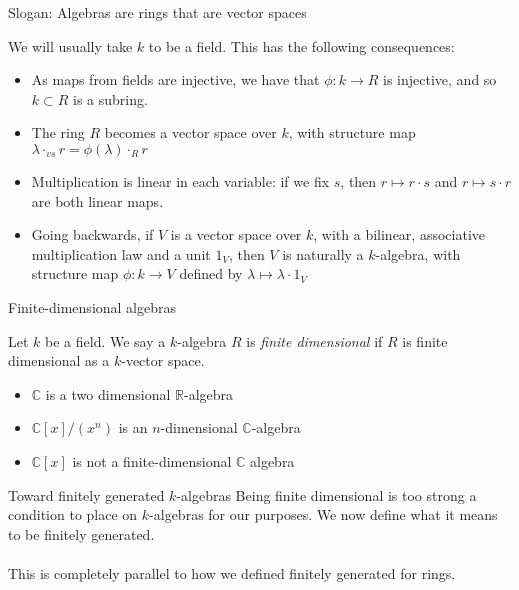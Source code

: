 \documentclass{beamer}
\newcommand{\C}{\mathbb{C}}
\newcommand{\R}{\mathbb{R}}
\begin{document}
\begin{frame}{Slogan: Algebras are rings that are vector spaces}

We will usually take $k$ to be a field.  This has the following consequences:

\begin{itemize}
\item As maps from fields are injective, we have that $\phi:k\to R$ is injective, and so $k\subset R$ is a subring.
\item The ring $R$ becomes a vector space over $k$, with structure map $\lambda\cdot_{vs} r=\phi(\lambda)\cdot_R r$
\item Multiplication is linear in each variable: if we fix $s$, then $r\mapsto r\cdot s$ and $r\mapsto s\cdot r$ are both linear maps.
\item Going backwards, if $V$ is a vector space over $k$, with a bilinear, associative multiplication law and a unit $1_V$, then $V$ is naturally a $k$-algebra, with structure map $\phi:k\to V$ defined by $\lambda\mapsto \lambda\cdot 1_V$

\end{itemize}

\end{frame}

\begin{frame}{Finite-dimensional algebras }
\begin{definition} Let $k$ be a field.  We say a $k$-algebra $R$ is \emph{finite dimensional} if $R$ is finite dimensional as a $k$-vector space.
\end{definition}

\begin{example}
\begin{itemize}
\item $\C$ is a two dimensional $\R$-algebra
\item $\C[x]/(x^n)$ is an $n$-dimensional $\C$-algebra
\item $\C[x]$ is \alert{not} a finite-dimensional $\C$ algebra
\end{itemize}
\end{example}
\end{frame}

\begin{frame}{Toward finitely generated $k$-algebras}
Being finite dimensional is too strong a condition to place on $k$-algebras for our purposes.  We now define what it means to be finitely generated.  \\~\\

This is completely parallel to how we defined finitely generated for rings.


\end{frame}
\end{document}
